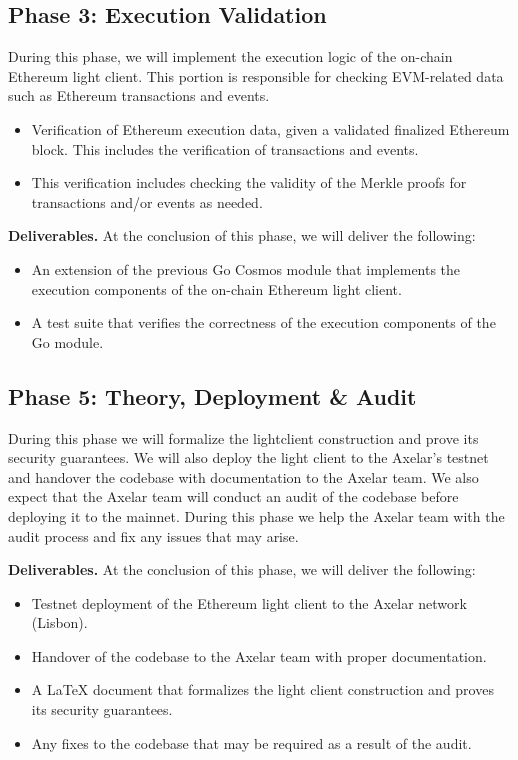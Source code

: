 \subsection{Phase 3: Execution Validation}

During this phase, we will implement the execution logic of the on-chain Ethereum light client. This portion is responsible for checking EVM-related data such as Ethereum transactions and events.

\begin{itemize}
  \item Verification of Ethereum execution data, given a validated finalized Ethereum block. This includes the verification of transactions and events.
  \item This verification includes checking the validity of the Merkle proofs for transactions and/or events as needed.
\end{itemize}

\noindent
\textbf{Deliverables.} At the conclusion of this phase, we will deliver the following:

\begin{itemize}
  \item An extension of the previous Go Cosmos module that implements the execution components of the on-chain Ethereum light client.
  \item A test suite that verifies the correctness of the execution components of the Go module.
\end{itemize}

\subsection{Phase 5: Theory, Deployment \& Audit}
During this phase we will formalize the lightclient construction and prove its security guarantees. We will also deploy the light client to the Axelar's testnet and handover the codebase with documentation to the Axelar team. We also expect that the Axelar team will conduct an audit of the codebase before deploying it to the mainnet. During this phase we help the Axelar team with the audit process and fix any issues that may arise.

\noindent
\textbf{Deliverables.} At the conclusion of this phase, we will deliver the following:
\begin{itemize}
  \item Testnet deployment of the Ethereum light client to the Axelar network (Lisbon).
  \item Handover of the codebase to the Axelar team with proper documentation.
  \item A LaTeX document that formalizes the light client construction and proves its security guarantees.
  \item Any fixes to the codebase that may be required as a result of the audit.
\end{itemize}
